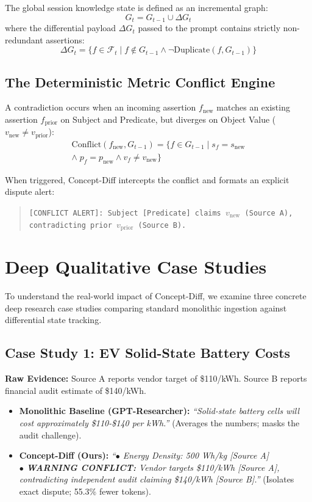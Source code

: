 \documentclass[10pt,twocolumn,letterpaper]{article}
\begin{document}
The global session knowledge state is defined as an incremental graph:
\begin{equation}
G_t = G_{t-1} \cup \Delta G_t
\end{equation}
where the differential payload $\Delta G_t$ passed to the prompt contains strictly non-redundant assertions:
\begin{equation}
\Delta G_t = \{ f \in \mathcal{F}_t \mid f \notin G_{t-1} \land \neg \text{Duplicate}(f, G_{t-1}) \}
\end{equation}

\subsection{The Deterministic Metric Conflict Engine}
A contradiction occurs when an incoming assertion $f_{\text{new}}$ matches an existing assertion $f_{\text{prior}}$ on Subject and Predicate, but diverges on Object Value ($v_{\text{new}} \neq v_{\text{prior}}$):
\begin{equation}
\begin{aligned}
\text{Conflict}(f_{\text{new}}, G_{t-1}) = \{ f \in G_{t-1} \mid s_f = s_{\text{new}} \\
\land\; p_f = p_{\text{new}} \land v_f \neq v_{\text{new}} \}
\end{aligned}
\end{equation}

When triggered, Concept-Diff intercepts the conflict and formats an explicit dispute alert:
\begin{quote}
\small
\texttt{[CONFLICT ALERT]: Subject [Predicate] claims $v_{\text{new}}$ (Source A), contradicting prior $v_{\text{prior}}$ (Source B).}
\end{quote}

\section{Deep Qualitative Case Studies}

To understand the real-world impact of Concept-Diff, we examine three concrete deep research case studies comparing standard monolithic ingestion against differential state tracking.

\subsection{Case Study 1: EV Solid-State Battery Costs}
\textbf{Raw Evidence:} Source A reports vendor target of \$110/kWh. Source B reports financial audit estimate of \$140/kWh.
\begin{itemize}
    \item \textbf{Monolithic Baseline (GPT-Researcher):} \textit{``Solid-state battery cells will cost approximately \$110-\$140 per kWh.''} (Averages the numbers; masks the audit challenge).
    \item \textbf{Concept-Diff (Ours):} \textit{``$\bullet$ Energy Density: 500 Wh/kg [Source A] \\ $\bullet$ \textbf{WARNING CONFLICT:} Vendor targets \$110/kWh [Source A], contradicting independent audit claiming \$140/kWh [Source B].''} (Isolates exact dispute; 55.3\% fewer tokens).
\end{itemize}
\end{document}

